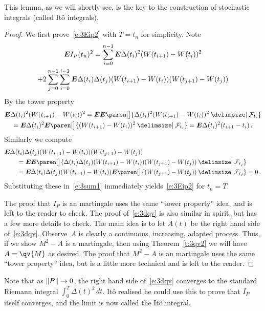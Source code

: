 This lemma, as we will shortly see, is the key to the construction of stochastic integrals (called It\^o integrals).
\begin{proof}%
  We first prove~\eqref{e:3Eip2} with $T = t_n$ for simplicity.
  Note
  \begin{multline}\label{e:3sum1}
    \bm{E} I_P(t_n)^2 
      = \sum_{i=0}^{n-1}
	  \bm{E} \Delta(t_i)^2 (W(t_{i+1}) - W(t_i))^2
    \\
	+ 2 \sum_{j=0}^{n-1}
	  \sum_{i=0}^{i-1}
	  \bm{E} \Delta(t_i) \Delta(t_j)
	    (W(t_{i+1}) - W(t_i))
	    (W(t_{j+1}) - W(t_j))
  \end{multline}
  By the tower property
  \begin{multline*}
    \E \Delta(t_i)^2 (W(t_{i+1}) - W(t_i))^2
      = \E \E \paren[\big]{ \Delta(t_i)^2 (W(t_{i+1}) - W(t_i))^2 \given \mathcal F_{t_i} }
    \\
      = \E \Delta(t_i)^2 \E \paren[\big]{ (W(t_{i+1}) - W(t_i))^2 \given \mathcal F_{t_i} }
      = \E \Delta(t_i)^2 (t_{i+1} - t_i)\,.
  \end{multline*}
  Similarly we compute
  \begin{align*}
    \MoveEqLeft
    \E \Delta(t_i) \Delta(t_j)
      (W(t_{i+1}) - W(t_i))
      (W(t_{j+1}) - W(t_j))
    \\
    &= \E \E \paren[\big]{ \Delta(t_i) \Delta(t_j)
      (W(t_{i+1}) - W(t_i))
      (W(t_{j+1}) - W(t_j)) \given \mathcal F_{t_j} }
    \\
    &= \E \Delta(t_i) \Delta(t_j)
	  (W(t_{i+1}) - W(t_i))
	  \E \paren[\big]{ (W(t_{j+1}) - W(t_j)) \given \mathcal F_{t_j} }
    = 0\,.
  \end{align*}
  Substituting these in~\eqref{e:3sum1} immediately yields~\eqref{e:3Eip2} for $t_n = T$.

  The proof that $I_P$ is an martingale uses the same ``tower property'' idea, and is left to the reader to check.
  The proof of~\eqref{e:3dqv} is also similar in spirit, but has a few more details to check.
  The main idea is to let $A(t)$ be the right hand side of~\eqref{e:3dqv}.
  Observe~$A$ is clearly a continuous, increasing, adapted process.
  Thus, if we show $M^2 - A$ is a martingale, then using Theorem~\ref{t:3qv2} we will have $A = \qv{M}$ as desired.
  The proof that $M^2 - A$ is an martingale uses the same ``tower property'' idea, but is a little more technical and is left to the reader.
\end{proof}

Note that as $\lVert P\rVert \to 0$, the right hand side of~\eqref{e:3dqv} converges to the standard Riemann integral $\int_0^T \Delta(t)^2 \, dt$.
It\^o realised he could use this to prove that $I_P$ itself converges, and the limit is now called the It\^o integral.

